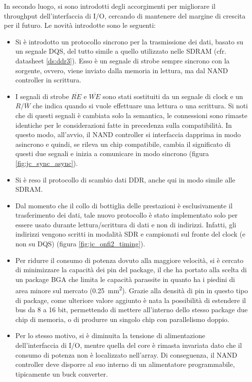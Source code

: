 \documentclass[11pt,4paper]{report}
\begin{document}
In secondo luogo, si sono introdotti degli accorgimenti per migliorare il throughput dell'interfaccia di I/O, cercando di mantenere del margine di crescita per il futuro. Le novità introdotte sono le seguenti:
\begin{itemize}
\item Si è introdotto un protocollo sincrono per la trasmissione dei dati, basato su un segnale DQS, del tutto simile a quello utilizzato nelle SDRAM (cfr. datasheet \ref{ds:ddr3}). Esso è un segnale di strobe sempre sincrono con la sorgente, ovvero, viene inviato dalla memoria in lettura, ma dal NAND controller in scrittura.
\item I segnali di strobe $\overline{RE}$ e $\overline{WE}$ sono stati sostituiti da un segnale di clock e un $R/\overline{W}$ che indica quando si vuole effettuare una lettura o una scrittura. Si noti che di questi segnali è cambiata solo la semantica, le connessioni sono rimaste identiche per le considerazioni fatte in precedenza sulla compatibilità. In questo modo, all'avvio, il NAND controller si interfaccia dapprima in modo asincrono e quindi, se rileva un chip compatibile, cambia il significato di questi due segnali e inizia a comunicare in modo sincrono (figura \ref{fig:jc_sync_async}).
\item Si è reso il protocollo di scambio dati DDR, anche qui in modo simile alle SDRAM.
\item Dal momento che il collo di bottiglia delle prestazioni è esclusivamente il trasferimento dei dati, tale nuovo protocollo è stato implementato solo per essere usato durante lettura/scrittura di dati e non di indirizzi. Infatti, gli indirizzi vengono scritti in modalità SDR e campionati sul fronte del clock (e non su DQS) (figura \ref{fig:jc_onfi2_timing}).
\item Per ridurre il consumo di potenza dovuto alla maggiore velocità, si è cercato di minimizzare la capacità dei pin del package, il che ha portato alla scelta di un package BGA che limita le capacità parassite in quanto ha i piedini di area minore sul mercato (\SI{0.25}{\milli\meter^2}). Grazie alla densità di pin in questo tipo di package, come ulteriore valore aggiunto è nata la possibilità di estendere il bus da 8 a 16 bit, permettendo di mettere all'interno dello stesso package due chip di memoria, o di produrre un singolo chip con parallelismo doppio.
\item Per lo stesso motivo, si è diminuita la tensione di alimentazione dell'interfaccia di I/O, mentre quella del core è rimasta invariata dato che il consumo di potenza non è localizzato nell'array. Di conseguenza, il NAND controller deve disporre al suo interno di un alimentatore programmabile, tipicamente un buck converter.
\end{itemize}
\end{document}
